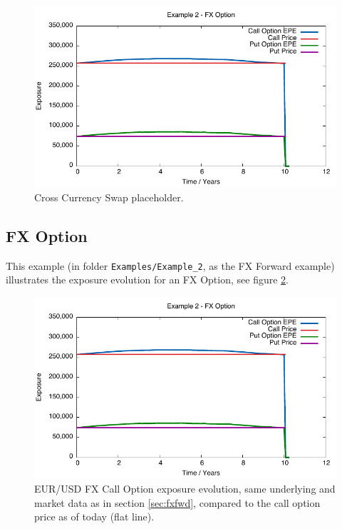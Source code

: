 \documentclass[12pt, a4paper]{article}
\begin{document}
\begin{figure}[hbt]
\begin{center}
\includegraphics[scale=1.0]{example_fxoption_fwdvariance.pdf}
\end{center}
\caption{Cross Currency Swap placeholder.}
\label{fig_6}
\end{figure}

\subsection{FX Option}

This example (in folder {\tt Examples/Example\_2}, as the FX Forward example) illustrates the exposure evolution for an FX Option, see figure \ref{fig_7}. 
\begin{figure}[hbt]
\begin{center}
\includegraphics[scale=1.0]{example_fxoption_fwdvariance.pdf}
\end{center}
\caption{EUR/USD FX Call Option exposure evolution, same underlying and market data as in section \ref{sec:fxfwd}, compared to the call option price as of today (flat line).}
\label{fig_7}
\end{figure}
\end{document}
